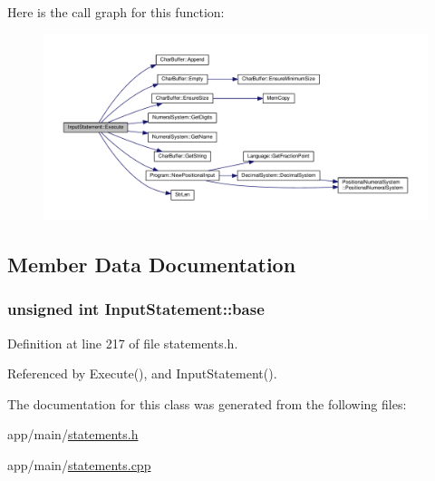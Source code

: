 Here is the call graph for this function\+:
\nopagebreak
\begin{figure}[H]
\begin{center}
\leavevmode
\includegraphics[width=350pt]{da/d61/classInputStatement_ac4a9288ba2fe5002ae78d65c270222a5_cgraph}
\end{center}
\end{figure}




\subsection{Member Data Documentation}
\subsubsection[{\texorpdfstring{base}{base}}]{\setlength{\rightskip}{0pt plus 5cm}unsigned int Input\+Statement\+::base\hspace{0.3cm}{\ttfamily [private]}}\hypertarget{classInputStatement_aa36f7a6bcb8f164a2b6c910f7199fe9b}{}\label{classInputStatement_aa36f7a6bcb8f164a2b6c910f7199fe9b}


Definition at line 217 of file statements.\+h.



Referenced by Execute(), and Input\+Statement().



The documentation for this class was generated from the following files\+:\begin{DoxyCompactItemize}
\item 
app/main/\hyperlink{statements_8h}{statements.\+h}\item 
app/main/\hyperlink{statements_8cpp}{statements.\+cpp}\end{DoxyCompactItemize}
